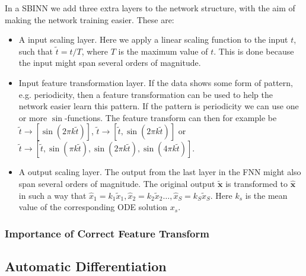 In a SBINN we add three extra layers to the network structure, with the aim of making the network training easier. These are:
\begin{itemize}
	\item A input scaling layer. Here we apply a linear scaling function to the input $t$, such that $\tilde{t}=t / T$, where $T$ is the maximum value of $t$. This is done because the input might span several orders of magnitude.
	\item Input feature transformation layer. If the data shows some form of pattern, e.g. periodicity, then a feature transformation can be used to help the network easier learn this pattern. If the pattern is periodicity we can use one or more $\sin$-functions. The feature transform can then for example be $\tilde{t} \rightarrow \left[ \sin(2 \pi k \tilde{t}) \right] $,  $\tilde{t} \rightarrow \left[ \tilde{t}, \sin(2 \pi k \tilde{t}) \right] $ or  $\tilde{t} \rightarrow \left[ \tilde{t}, \sin(\pi k \tilde{t}), \sin(2 \pi k \tilde{t}), \sin(4 \pi k \tilde{t}) \right]$. 
	\item A output scaling layer. The output from the last layer in the FNN might also span several orders of magnitude. The original output $\mathbf{\tilde{x}}$ is transformed to $\mathbf{\hat{x}}$ in such a way that  $\hat{x}_{1}=k_{1} \tilde{x}_{1}, \hat{x}_{2}=k_{2} \tilde{x}_{2} \ldots, \hat{x}_{S}=k_{S} \tilde{x}_{S}$. Here $k_s$ is the mean value of the corresponding ODE solution $x_s$.
\end{itemize}






\subsubsection{Importance of Correct Feature Transform}





\subsection{Automatic Differentiation} \label{sec:autodiff}





